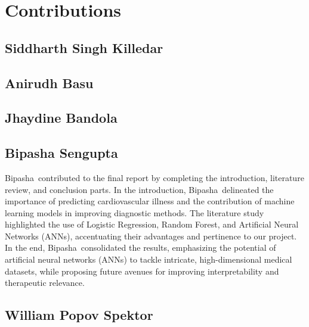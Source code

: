 \section{Contributions}

\subsection{Siddharth Singh Killedar}

\subsection{Anirudh Basu}

\subsection{Jhaydine Bandola}

\subsection{Bipasha Sengupta}
Bipasha contributed to the final report by completing the introduction, literature review, and conclusion parts. In the introduction, Bipasha delineated the importance of predicting cardiovascular illness and the contribution of machine learning models in improving diagnostic methods. The literature study highlighted the use of Logistic Regression, Random Forest, and Artificial Neural Networks (ANNs), accentuating their advantages and pertinence to our project. In the end, Bipasha consolidated the results, emphasizing the potential of artificial neural networks (ANNs) to tackle intricate, high-dimensional medical datasets, while proposing future avenues for improving interpretability and therapeutic relevance.

\subsection{William Popov Spektor}
